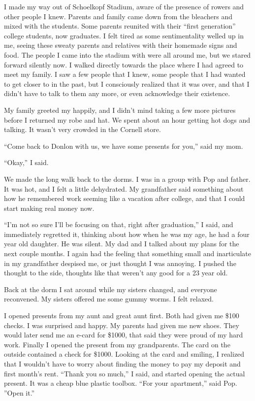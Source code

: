 I made my way out of Schoelkopf Stadium, aware of the presence of rowers and
other people I knew.  Parents and family came down from the bleachers and mixed
with the students.  Some parents reunited with their ``first generation''
college students, now graduates.  I felt tired as some sentimentality welled up
in me, seeing these sweaty parents and relatives with their homemade signs and
food.  The people I came into the stadium with were all around me, but we stared
forward silently now.  I walked directly towards the place where I had agreed to
meet my family.  I saw a few people that I knew, some people that I had wanted
to get closer to in the past, but I consciously realized that it was over, and
that I didn't have to talk to them any more, or even acknowledge their existence.

My family greeted my happily, and I didn't mind taking a few more pictures
before I returned my robe and hat.  We spent about an hour getting hot dogs and
talking.  It wasn't very crowded in the Cornell store. 

``Come back to Donlon with us, we have some presents for you,'' said my mom. 

``Okay,'' I said.  

We made the long walk back to the dorms.  I was in a group with Pop and father.
It was hot, and I felt a little dehydrated.  My grandfather said something about
how he remembered work seeming like a vacation after college, and that I could
start making real money now.

``I'm not so sure I'll be focusing on that, right after graduation,'' I said,
and immediately regretted it, thinking about how when he was my age, he had a
four year old daughter.  He was silent.  My dad and I talked about my plans for
the next couple months.  I again had the feeling that something small and
inarticulate in my grandfather despised me, or just thought I was annoying.  I
pushed the thought to the side, thoughts like that weren't any good for a 23
year old.

Back at the dorm I sat around while my sisters changed, and everyone reconvened.
My sisters offered me some gummy worms.  I felt relaxed.

I opened presents from my aunt and great aunt first.  Both had given me \$100
checks.  I was surprised and happy.  My parents had given me new shoes.  They
would later send me an e-card for \$1000, that said they were proud of my hard
work.  Finally I opened the present from my grandparents.  The card on the
outside contained a check for \$1000.  Looking at the card and smiling, I
realized that I wouldn't have to worry about finding the money to pay my deposit
and first month's rent.  ``Thank you so much,'' I said, and started opening the
actual present.  It was a cheap blue plastic toolbox.  ``For your apartment,''
said Pop.  ''Open it.''

